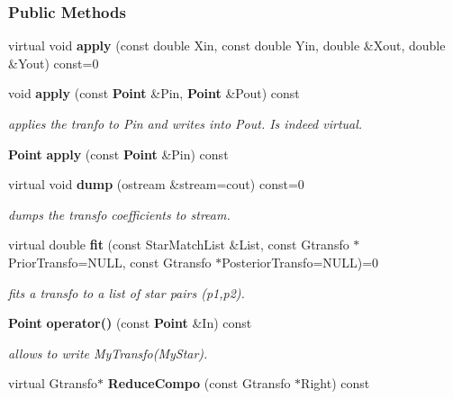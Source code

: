 \subsubsection*{Public Methods}
\begin{CompactItemize}
\item 
{}
virtual void {\bf apply} (const double Xin, const double Yin, double \&Xout, double \&Yout) const=0\label{class_gtransfo_a0}

\item 
{}
void {\bf apply} (const {\bf Point} \&Pin, {\bf Point} \&Pout) const\label{class_gtransfo_a1}

\begin{CompactList}\small\item\em applies the tranfo to Pin and writes into Pout. Is indeed virtual.\item\end{CompactList}\item 
{}
{\bf Point} {\bf apply} (const {\bf Point} \&Pin) const\label{class_gtransfo_a2}

\item 
{}
virtual void {\bf dump} (ostream \&stream=cout) const=0\label{class_gtransfo_a3}

\begin{CompactList}\small\item\em dumps the transfo coefficients to stream.\item\end{CompactList}\item 
virtual double {\bf fit} (const Star\-Match\-List \&List, const Gtransfo $\ast$Prior\-Transfo=NULL, const Gtransfo $\ast$Posterior\-Transfo=NULL)=0
\begin{CompactList}\small\item\em fits a transfo to a list of star pairs (p1,p2).\item\end{CompactList}\item 
{}
{\bf Point} {\bf operator()} (const {\bf Point} \&In) const\label{class_gtransfo_a5}

\begin{CompactList}\small\item\em allows to write My\-Transfo(My\-Star).\item\end{CompactList}\item 
{}
virtual Gtransfo$\ast$ {\bf Reduce\-Compo} (const Gtransfo $\ast$Right) const\label{class_gtransfo_a6}


\end{CompactItemize}

